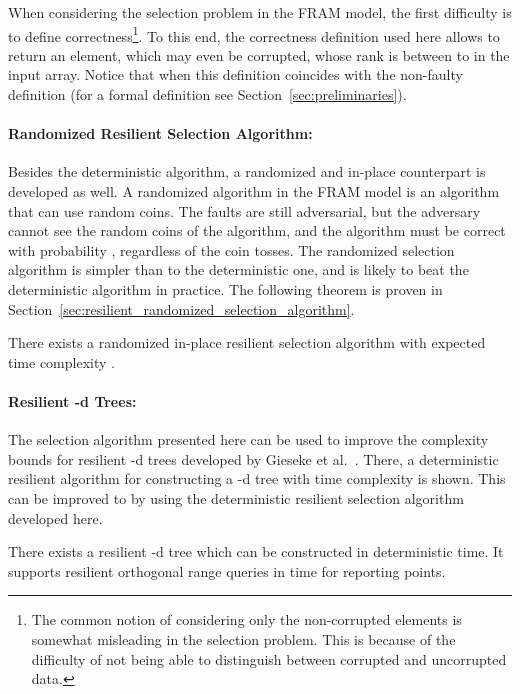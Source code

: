 \documentclass{llncs}
\begin{document}
When considering the selection problem in the FRAM model, the first difficulty is to define correctness\footnote{The common notion of considering only the non-corrupted elements is somewhat misleading in the selection problem. This is because of the difficulty of not being able to distinguish between corrupted and uncorrupted data.}.  To this end, the correctness definition used here allows to return an element, which may even be corrupted, whose rank is between  to  in the input array. Notice that when  this definition coincides with the non-faulty definition (for a formal definition see Section~\ref{sec:preliminaries}).



\paragraph{Randomized Resilient Selection Algorithm:}

Besides the deterministic algorithm, a randomized and in-place counterpart is developed as well.
A randomized algorithm in the FRAM model is an algorithm that can use random coins. The faults are still adversarial, but the adversary cannot see the random coins of the algorithm, and the algorithm must be correct with probability , regardless of the coin tosses. The randomized selection algorithm is simpler than to the deterministic one, and is likely to beat the deterministic algorithm in practice.
The following theorem is proven in Section~\ref{sec:resilient_randomized_selection_algorithm}.

\begin{theorem}
There exists a randomized in-place resilient selection algorithm with expected time complexity .
\end{theorem}




\paragraph{Resilient -d Trees:}

The selection algorithm presented here can be used to improve the complexity bounds for resilient -d trees developed by Gieseke et al.~\cite{kd_trees}. There, a deterministic resilient algorithm for constructing a -d tree with  time complexity is shown. This can be improved to  by using the deterministic resilient selection algorithm developed here.

\begin{theorem}
There exists a resilient -d tree which can be constructed in deterministic  time.
It supports resilient orthogonal range queries in  time for reporting  points.
\end{theorem}
\end{document}
